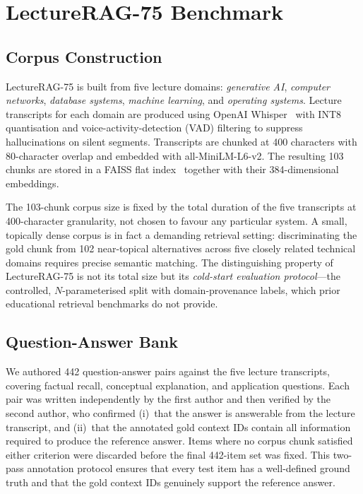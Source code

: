 \documentclass[preprint,12pt]{elsarticle}
\begin{document}
\section{LectureRAG-75 Benchmark}
\label{sec:benchmark}

\subsection{Corpus Construction}
LectureRAG-75 is built from five lecture domains: \emph{generative AI},
\emph{computer networks}, \emph{database systems}, \emph{machine learning},
and \emph{operating systems}.  Lecture transcripts for each domain are produced
using OpenAI Whisper~\citep{radford2023whisper} with INT8 quantisation and
voice-activity-detection (VAD) filtering to suppress hallucinations on silent
segments.  Transcripts are chunked at 400 characters with 80-character overlap
and embedded with all-MiniLM-L6-v2.  The resulting 103 chunks are stored in a
FAISS flat index~\citep{johnson2021faiss} together with their 384-dimensional
embeddings.

The 103-chunk corpus size is fixed by the total duration of the five
transcripts at 400-character granularity, not chosen to favour any particular
system.  A small, topically dense corpus is in fact a demanding retrieval
setting: discriminating the gold chunk from 102 near-topical alternatives
across five closely related technical domains requires precise semantic
matching.  The distinguishing property of LectureRAG-75 is not its total size
but its \emph{cold-start evaluation protocol}---the controlled,
$N$-parameterised split with domain-provenance labels, which prior educational
retrieval benchmarks do not provide.

\subsection{Question-Answer Bank}
We authored 442 question-answer pairs against the five lecture transcripts,
covering factual recall, conceptual explanation, and application questions.
Each pair was written independently by the first author and then verified by
the second author, who confirmed (i)~that the answer is answerable from the
lecture transcript, and (ii)~that the annotated gold context IDs contain all
information required to produce the reference answer.  Items where no corpus
chunk satisfied either criterion were discarded before the final 442-item set
was fixed.  This two-pass annotation protocol ensures that every test item
has a well-defined ground truth and that the gold context IDs genuinely
support the reference answer.
\end{document}
